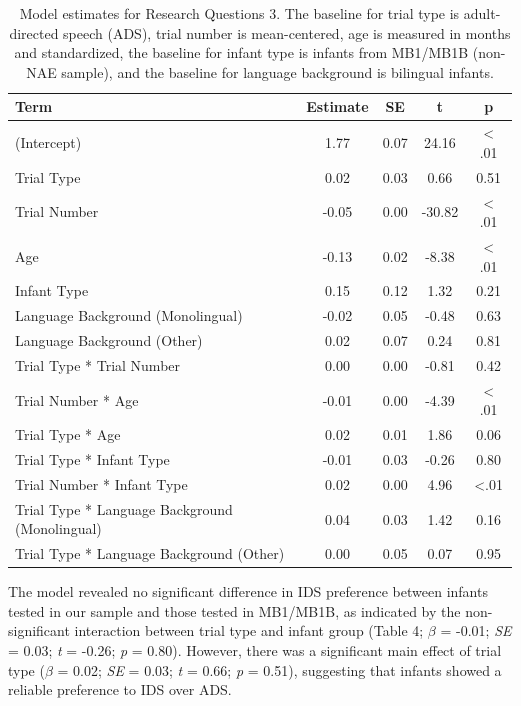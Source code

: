 \documentclass[
  ,man,floatsintext]{apa6}
\begin{document}
\begin{table}

\caption{Model estimates for Research Questions 3. The baseline for trial type is adult-directed speech (ADS), trial number is mean-centered, age is measured in months and standardized, the baseline for infant type is infants from MB1/MB1B (non-NAE sample), and the baseline for language background is bilingual infants.}
\centering
\begin{tabular}[t]{lcccc}
\toprule
Term & Estimate & SE & t & p\\
\midrule
(Intercept) & 1.77 & 0.07 & 24.16 & < .01\\
Trial Type & 0.02 & 0.03 & 0.66 & 0.51\\
Trial Number & -0.05 & 0.00 & -30.82 & < .01\\
Age & -0.13 & 0.02 & -8.38 & < .01\\
Infant Type & 0.15 & 0.12 & 1.32 & 0.21\\
\addlinespace
Language Background (Monolingual) & -0.02 & 0.05 & -0.48 & 0.63\\
Language Background (Other) & 0.02 & 0.07 & 0.24 & 0.81\\
Trial Type * Trial Number & 0.00 & 0.00 & -0.81 & 0.42\\
Trial Number * Age & -0.01 & 0.00 & -4.39 & < .01\\
Trial Type * Age & 0.02 & 0.01 & 1.86 & 0.06\\
\addlinespace
Trial Type * Infant Type & -0.01 & 0.03 & -0.26 & 0.80\\
Trial Number * Infant Type & 0.02 & 0.00 & 4.96 & <.01\\
Trial Type * Language Background (Monolingual) & 0.04 & 0.03 & 1.42 & 0.16\\
Trial Type * Language Background (Other) & 0.00 & 0.05 & 0.07 & 0.95\\
\bottomrule
\end{tabular}
\end{table}

The model revealed no significant difference in IDS preference between infants tested in our sample and those tested in MB1/MB1B, as indicated by the non-significant interaction between trial type and infant group (Table 4; \emph{\(\beta\)} = -0.01; \emph{SE} = 0.03; \emph{t} = -0.26; \emph{p} = 0.80). However, there was a significant main effect of trial type (\emph{\(\beta\)} = 0.02; \emph{SE} = 0.03; \emph{t} = 0.66; \emph{p} = 0.51), suggesting that infants showed a reliable preference to IDS over ADS.
\end{document}
